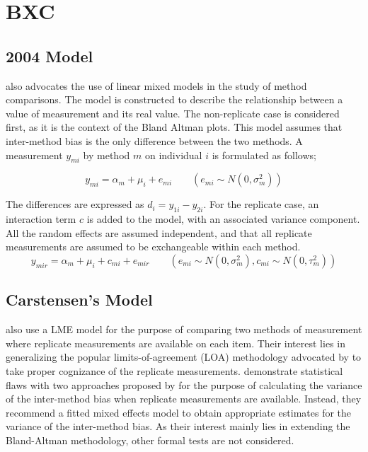 \documentclass[12pt, a4paper]{report}
\theoremstyle{plain}
\theoremstyle{definition}
\theoremstyle{remark}
\begin{document}
	\chapter{BXC}	
	\section{2004 Model}
	\cite{BXC2004} also advocates the use of linear mixed models in the study of method comparisons. 
	The model is constructed to describe the relationship between a value of measurement and its
	real value.
	The non-replicate case is considered first, as it is the context of the Bland Altman plots. This model assumes that
	inter-method bias is the only difference between the two methods. A measurement $y_{mi}$ by method $m$ on individual $i$ is
	formulated as follows;
	
	\begin{equation}
	y_{mi}  = \alpha_{m} + \mu_{i} + e_{mi} \qquad ( e_{mi} \sim
	N(0,\sigma^{2}_{m}))
	\end{equation}
	
	The differences are expressed as $d_{i} = y_{1i} - y_{2i}$. For the replicate case, an interaction term $c$ is added to the model, with an associated variance component. All the random effects are assumed independent, and that all replicate measurements are assumed to be exchangeable within each method.
	\begin{equation}
	y_{mir}  = \alpha_{m} + \mu_{i} + c_{mi} + e_{mir} \qquad ( e_{mi}
	\sim N(0,\sigma^{2}_{m}), c_{mi} \sim N(0,\tau^{2}_{m}))
	\end{equation}
	\section{Carstensen's Model}
	\cite{BXC2008} also use a LME model for the purpose of comparing two methods of measurement where replicate measurements are available on each item. Their interest lies in generalizing the popular limits-of-agreement (LOA) methodology advocated by \citet{BA86} to take proper cognizance of the replicate measurements. \citet{BXC2008} demonstrate statistical flaws with two approaches proposed by \citet{BA99} for the purpose of calculating the variance of the inter-method bias when replicate measurements are available. Instead, they recommend a fitted mixed effects model to obtain appropriate estimates for the variance of the inter-method bias. As their interest mainly lies in extending the Bland-Altman methodology, other formal tests are not considered.
	
\end{document}
